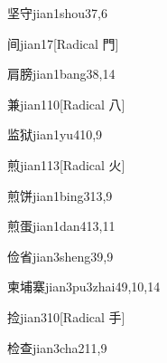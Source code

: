 \begin{verbete}{坚守}{jian1shou3}{7,6}
\end{verbete}

\begin{verbete}{间}{jian1}{7}[Radical 門]
\end{verbete}

\begin{verbete}{肩膀}{jian1bang3}{8,14}
\end{verbete}

\begin{verbete}{兼}{jian1}{10}[Radical 八]
\end{verbete}

\begin{verbete}{监狱}{jian1yu4}{10,9}
\end{verbete}

\begin{verbete}{煎}{jian1}{13}[Radical 火]
\end{verbete}

\begin{verbete}{煎饼}{jian1bing3}{13,9}
\end{verbete}

\begin{verbete}{煎蛋}{jian1dan4}{13,11}
\end{verbete}

\begin{verbete}{俭省}{jian3sheng3}{9,9}
\end{verbete}

\begin{verbete}{柬埔寨}{jian3pu3zhai4}{9,10,14}
\end{verbete}

\begin{verbete}{捡}{jian3}{10}[Radical 手]
\end{verbete}

\begin{verbete}{检查}{jian3cha2}{11,9}
\end{verbete}

